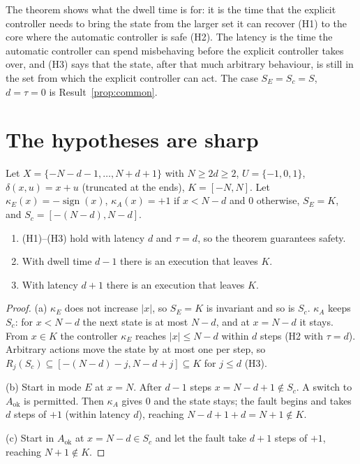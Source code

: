 The theorem shows what the dwell time is for: it is the time that the explicit controller needs to bring the state from the larger set it can recover (H1) to the core where the automatic controller is safe (H2). The latency is the time the automatic controller can spend misbehaving before the explicit controller takes over, and (H3) says that the state, after that much arbitrary behaviour, is still in the set from which the explicit controller can act. The case $S_E=S_c=S$, $d=\tau=0$ is Result~\ref{prop:common}.

\section{The hypotheses are sharp}

\begin{newresult}\label{prop:sharp}
Let $X=\{-N-d-1,\dots,N+d+1\}$ with $N\ge2d\ge2$, $U=\{-1,0,1\}$, $\delta(x,u)=x+u$ (truncated at the ends), $K=[-N,N]$. Let $\kappa_E(x)=-\operatorname{sign}(x)$, $\kappa_A(x)=+1$ if $x<N-d$ and $0$ otherwise, $S_E=K$, and $S_c=[-(N-d),N-d]$.
\begin{enumerate}[nosep,label=(\alph*)]
  \item (H1)--(H3) hold with latency $d$ and $\tau=d$, so the theorem guarantees safety.
  \item With dwell time $d-1$ there is an execution that leaves $K$.
  \item With latency $d+1$ there is an execution that leaves $K$.
\end{enumerate}
\end{newresult}
\begin{proof}
(a) $\kappa_E$ does not increase $|x|$, so $S_E=K$ is invariant and so is $S_c$. $\kappa_A$ keeps $S_c$: for $x<N-d$ the next state is at most $N-d$, and at $x=N-d$ it stays. From $x\in K$ the controller $\kappa_E$ reaches $|x|\le N-d$ within $d$ steps (H2 with $\tau=d$). Arbitrary actions move the state by at most one per step, so $R_j(S_c)\subseteq[-(N-d)-j,N-d+j]\subseteq K$ for $j\le d$ (H3).

(b) Start in mode $E$ at $x=N$. After $d-1$ steps $x=N-d+1\notin S_c$. A switch to $A_{\mathrm{ok}}$ is permitted. Then $\kappa_A$ gives $0$ and the state stays; the fault begins and takes $d$ steps of $+1$ (within latency $d$), reaching $N-d+1+d=N+1\notin K$.

(c) Start in $A_{\mathrm{ok}}$ at $x=N-d\in S_c$ and let the fault take $d+1$ steps of $+1$, reaching $N+1\notin K$.
\end{proof}

